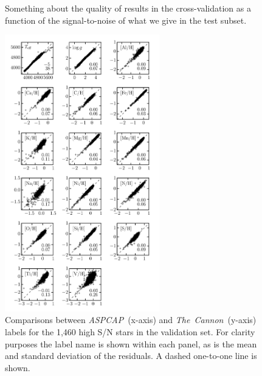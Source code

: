 \documentclass[12pt,preprint]{aastex}
\newcommand{\project}[1]{\textsl{#1}}
\newcommand{\TheCannon}{\project{The~Cannon}}
\newcommand{\acronym}[1]{{\small{#1}}}
\newcommand{\aspcap}{\project{\acronym{ASPCAP}}}
\begin{document}
\begin{figure}[p]
\caption{Something about the quality of results in the
  cross-validation as a function of the signal-to-noise of what we
  give in the test subset.\label{fig:snr}}
\end{figure}




\begin{figure}[p]
\includegraphics[width=0.6\textwidth]{regularized-model-validation.pdf}
\caption{Comparisons between \aspcap\ (x-axis) and \TheCannon\ (y-axis)
labels for the 1,460 high S/N stars in the validation set.  For clarity
purposes the label name is shown within each panel, as is the mean
and standard deviation of the residuals.  A
dashed one-to-one line is shown.
\label{fig:regularized-model-validation}}
\end{figure}
\end{document}
